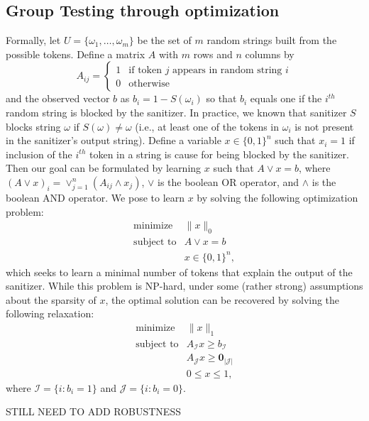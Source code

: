 \subsection{Group Testing through optimization}
Formally, let $U=\{\omega_1,\ldots,\omega_m\}$ be the set of $m$ random strings built from the possible tokens.  Define a matrix $A$ with $m$ rows and $n$ columns by 
\[A_{ij}=
\begin{cases} 1 &\mbox{if token } j \mbox{ appears in random string } i \\
0 & \mbox{otherwise}
\end{cases} 
\]
and the observed vector $b$ as $b_i=1-S(\omega_i)$ so that $b_i$ equals one if the $i^{th}$ random string is blocked by the sanitizer.  In practice, we known that sanitizer $S$ blocks string $\omega$ if $S(\omega)\neq\omega$ (i.e., at least one of the tokens in $\omega_i$ is not present in the sanitizer's output string).  Define a variable $x\in\{0,1\}^n$ such that $x_i=1$ if inclusion of the $i^{th}$ token in a string is cause for being blocked by the sanitizer.  Then our goal can be formulated by learning $x$ such that $A\vee x=b$, where $(A\vee x)_i=\vee_{j=1}^n(A_{ij}\wedge x_j)$, $\vee$ is the boolean OR operator, and $\wedge$ is the boolean AND operator.  We pose to learn $x$ by solving the following optimization problem:
\[\begin{array}{ll}
\mbox{minimize} & \|x\|_0\\
\mbox{subject to} & A\vee x=b \\
& x\in\{0,1\}^n,
\end{array}\]
which seeks to learn a minimal number of tokens that explain the output of the sanitizer.  While this problem is NP-hard, under some (rather strong) assumptions about the sparsity of $x$, the optimal solution can be recovered by solving the following relaxation:
\[\begin{array}{ll}
\mbox{minimize} & \|x\|_1\\
\mbox{subject to} & A_\mathcal{I}x\geq b_\mathcal{I} \\
& A_\mathcal{J}x\geq \textbf{0}_{|\mathcal{J}|} \\
& 0\leq x \leq 1,
\end{array}\]
where $\mathcal{I}=\{i : b_i=1\}$ and $\mathcal{J}=\{i : b_i=0\}$.  

STILL NEED TO ADD ROBUSTNESS
